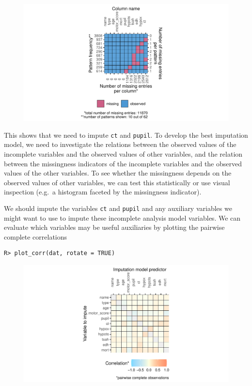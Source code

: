 \documentclass[
  article]{jss}
\begin{document}
\begin{figure}[h]

{\centering \includegraphics{manuscript_files/figure-pdf/unnamed-chunk-28-1.pdf}

}

\end{figure}

This shows that we need to impute \texttt{ct} and \texttt{pupil}. To
develop the best imputation model, we need to investigate the relations
between the observed values of the incomplete variables and the observed
values of other variables, and the relation between the missingness
indicators of the incomplete variables and the observed values of the
other variables. To see whether the missingness depends on the observed
values of other variables, we can test this statistically or use visual
inspection (e.g.~a histogram faceted by the missingness indicator).

We should impute the variables \texttt{ct} and \texttt{pupil} and any
auxiliary variables we might want to use to impute these incomplete
analysis model variables. We can evaluate which variables may be useful
auxiliaries by plotting the pairwise complete correlations

\begin{verbatim}
R> plot_corr(dat, rotate = TRUE)
\end{verbatim}

\begin{figure}[h]

{\centering \includegraphics{manuscript_files/figure-pdf/unnamed-chunk-29-1.pdf}

}

\end{figure}
\end{document}

